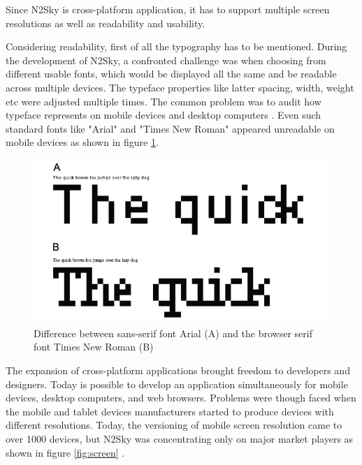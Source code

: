 Since N2Sky is cross-platform application, it has to support multiple screen resolutions as well as readability and usability. 

Considering readability, first of all the typography has to be mentioned. During the development of N2Sky, a confronted challenge was when choosing from different usable fonts, which would be displayed all the same and be readable across multiple devices. The typeface \cite{wiki:typeface} properties like latter spacing, width, weight etc were adjusted multiple times. The common problem was to audit how typeface represents on mobile devices and desktop computers \cite{responsive_book}. Even such standard fonts like "Arial" and "Times New Roman" appeared unreadable on mobile devices as shown in figure \ref{fig:typo}.

\begin{figure}[H]
\begin{center}
  \includegraphics[scale=0.5]{components/3/components/typo.png}
  \caption{Difference between sans-serif font Arial (A) and the browser serif font Times New Roman (B) }
  \label{fig:typo}
\end{center}
\end{figure}

The expansion of cross-platform applications brought freedom to developers and designers. Today is possible to develop an application simultaneously for mobile devices, desktop computers, and web browsers. Problems were though faced when the mobile and tablet devices manufacturers started to produce devices with different resolutions. Today, the versioning of mobile screen resolution came to over 1000 devices, but N2Sky was concentrating only on major market players as shown in figure \ref{fig:screen} \cite{mobile_resolution}.

